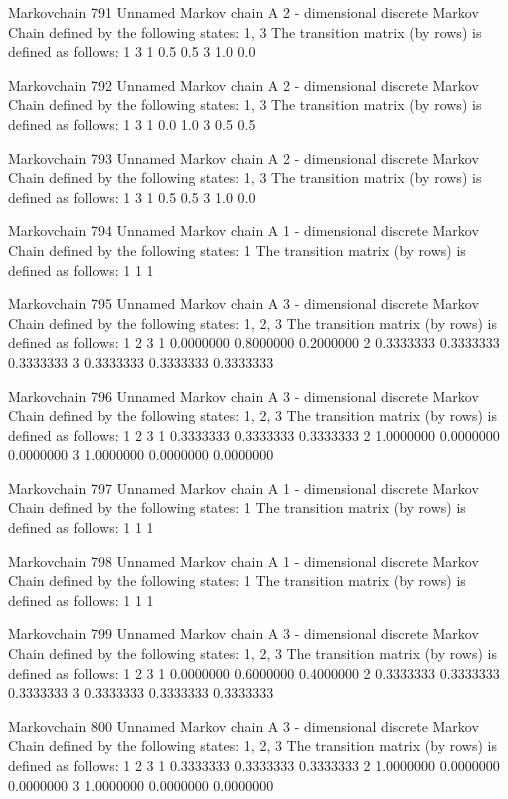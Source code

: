 \documentclass[
  nojss]{jss}
\begin{document}
\begin{CodeChunk}
\begin{CodeOutput}
Markovchain  791 
Unnamed Markov chain 
 A  2 - dimensional discrete Markov Chain defined by the following states: 
 1, 3 
 The transition matrix  (by rows)  is defined as follows: 
    1   3
1 0.5 0.5
3 1.0 0.0

Markovchain  792 
Unnamed Markov chain 
 A  2 - dimensional discrete Markov Chain defined by the following states: 
 1, 3 
 The transition matrix  (by rows)  is defined as follows: 
    1   3
1 0.0 1.0
3 0.5 0.5

Markovchain  793 
Unnamed Markov chain 
 A  2 - dimensional discrete Markov Chain defined by the following states: 
 1, 3 
 The transition matrix  (by rows)  is defined as follows: 
    1   3
1 0.5 0.5
3 1.0 0.0

Markovchain  794 
Unnamed Markov chain 
 A  1 - dimensional discrete Markov Chain defined by the following states: 
 1 
 The transition matrix  (by rows)  is defined as follows: 
  1
1 1

Markovchain  795 
Unnamed Markov chain 
 A  3 - dimensional discrete Markov Chain defined by the following states: 
 1, 2, 3 
 The transition matrix  (by rows)  is defined as follows: 
          1         2         3
1 0.0000000 0.8000000 0.2000000
2 0.3333333 0.3333333 0.3333333
3 0.3333333 0.3333333 0.3333333

Markovchain  796 
Unnamed Markov chain 
 A  3 - dimensional discrete Markov Chain defined by the following states: 
 1, 2, 3 
 The transition matrix  (by rows)  is defined as follows: 
          1         2         3
1 0.3333333 0.3333333 0.3333333
2 1.0000000 0.0000000 0.0000000
3 1.0000000 0.0000000 0.0000000

Markovchain  797 
Unnamed Markov chain 
 A  1 - dimensional discrete Markov Chain defined by the following states: 
 1 
 The transition matrix  (by rows)  is defined as follows: 
  1
1 1

Markovchain  798 
Unnamed Markov chain 
 A  1 - dimensional discrete Markov Chain defined by the following states: 
 1 
 The transition matrix  (by rows)  is defined as follows: 
  1
1 1

Markovchain  799 
Unnamed Markov chain 
 A  3 - dimensional discrete Markov Chain defined by the following states: 
 1, 2, 3 
 The transition matrix  (by rows)  is defined as follows: 
          1         2         3
1 0.0000000 0.6000000 0.4000000
2 0.3333333 0.3333333 0.3333333
3 0.3333333 0.3333333 0.3333333

Markovchain  800 
Unnamed Markov chain 
 A  3 - dimensional discrete Markov Chain defined by the following states: 
 1, 2, 3 
 The transition matrix  (by rows)  is defined as follows: 
          1         2         3
1 0.3333333 0.3333333 0.3333333
2 1.0000000 0.0000000 0.0000000
3 1.0000000 0.0000000 0.0000000


\end{CodeOutput}
\end{CodeChunk}
\end{document}
